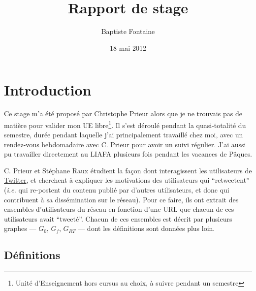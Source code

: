 \documentclass[]{article}
\title{Rapport de stage}
\author{Baptiste Fontaine}
\date{18 mai 2012}
\begin{document}
\maketitle

\section{Introduction}

Ce stage m'a été proposé par Christophe Prieur alors que je ne trouvais
pas de matière pour valider mon UE libre\footnote{Unité d'Enseignement
 hors cursus au choix, à suivre pendant un semestre}. Il s'est déroulé
pendant la quasi-totalité du semestre, durée pendant laquelle j'ai
principalement travaillé chez moi, avec un rendez-vous hebdomadaire avec
C. Prieur pour avoir un suivi régulier. J'ai aussi pu travailler
directement au LIAFA plusieurs fois pendant les vacances de Pâques.

C. Prieur et Stéphane Raux étudient la façon dont interagissent les
utilisateurs de \href{https://twitter.com/}{Twitter}, et cherchent à 
expliquer les motivations des utilisateurs qui ``retweetent''
(\emph{i.e.} qui re-postent du contenu publié par d'autres utilisateurs,
et donc qui contribuent à sa dissémination sur le réseau). Pour ce
faire, ils ont extrait des ensembles d'utilisateurs du réseau en
fonction d'une URL que chacun de ces utilisateurs avait ``tweeté''.
Chacun de ces ensembles est décrit par plusieurs graphes --- $G_{0}$, $G_{f}$,
$G_{RT}$ --- dont les définitions sont données plus loin.

\subsection{Définitions}
\end{document}
